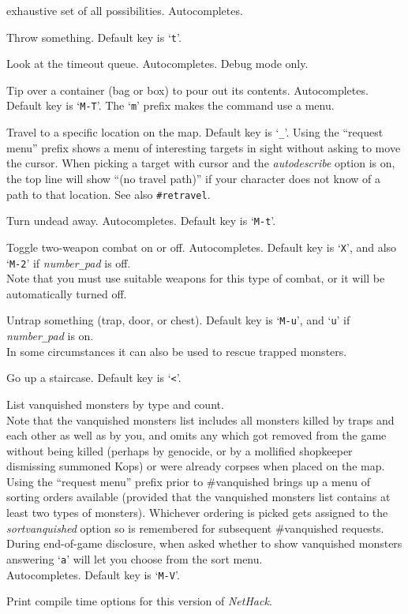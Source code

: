 exhaustive set of all possibilities.
Autocompletes.
\item[\tb{\#throw}]
Throw something. Default key is `{\tt t}'.
\item[\tb{\#timeout}]
Look at the timeout queue.
Autocompletes.
Debug mode only.
\item[\tb{\#tip}]
Tip over a container (bag or box) to pour out its contents.
Autocompletes. Default key is `{\tt M-T}'.
The `{\tt m}' prefix makes the command use a menu.
\item[\tb{\#travel}]
Travel to a specific location on the map.
Default key is `{\tt \verb+_+}'.
Using the ``request menu'' prefix shows a menu of interesting targets in sight
without asking to move the cursor.
When picking a target with cursor and the {\it autodescribe\/}
option is on, the top line will show ``(no travel path)'' if
your character does not know of a path to that location.
See also {\tt \#retravel}.
\item[\tb{\#turn}]
Turn undead away. Autocompletes. Default key is `{\tt M-t}'.
\item[\tb{\#twoweapon}]
Toggle two-weapon combat on or off. Autocompletes.
Default key is `{\tt X}',
and also `{\tt M-2}' if {\it number\verb+_+pad\/} is off.\\
Note that you must
use suitable weapons for this type of combat, or it will
be automatically turned off.
\item[\tb{\#untrap}]
Untrap something (trap, door, or chest).
Default key is `{\tt M-u}', and `{\tt u}' if {\it number\verb+_+pad\/} is on.\\
In some circumstances it can also be used to rescue trapped monsters.
\item[\tb{\#up}]
Go up a staircase. Default key is `{\tt <}'.
\item[\tb{\#vanquished}]
List vanquished monsters by type and count.
\\
Note that the vanquished monsters list includes all monsters killed by
traps and each other as well as by you, and omits any which got removed
from the game without being killed (perhaps by genocide, or by a mollified
shopkeeper dismissing summoned Kops) or were already corpses when placed
on the map.
\\
Using the ``request menu'' prefix prior to \#vanquished brings up
a menu of sorting orders available (provided that the vanquished monsters
list contains at least two types of monsters).
Whichever ordering is picked gets assigned to the {\it sortvanquished}
option so is remembered for subsequent \#vanquished requests.
During end-of-game disclosure, when asked whether to show vanquished
monsters answering `{\tt a}' will let you choose from the sort menu.
\\
Autocompletes.
Default key is `{\tt M-V}'.
\item[\tb{\#version}]
Print compile time options for this version of {\it NetHack\/}.

